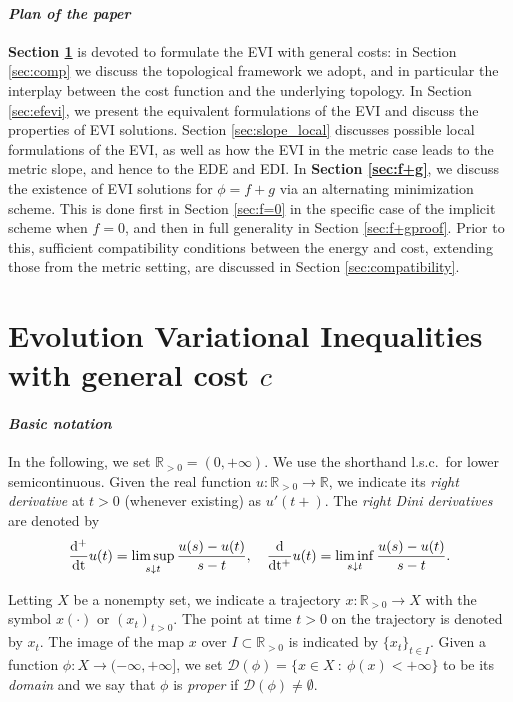 \documentclass[reqno]{amsart}
\theoremstyle{plain}
\theoremstyle{remark}
\theoremstyle{plain}
\numberwithin{equation}{section}
\theoremstyle{remark}
\newcommand{\R}{\mathbb{R}}
\newcommand{\dom}[1]{\mathscr{D}(#1)}
\begin{document}
\medskip

\paragraph{\em\bfseries Plan of the paper}   \textbf{Section \ref{sec:EVI}}    is devoted to  formulate the EVI  
with general costs: in Section \ref{sec:comp} we discuss the topological framework we adopt, and in particular the interplay between the cost function and the underlying topology.  In  Section \ref{sec:efevi}, we present the equivalent formulations of the EVI and  discuss the properties of EVI solutions.    Section \ref{sec:slope_local}  discusses  possible local formulations of the EVI,  as well as how the EVI in the metric case leads to the metric slope, and hence to the EDE and EDI. In \textbf{Section \ref{sec:f+g}}, we discuss the existence of EVI solutions for $\phi=f+g$ via an alternating minimization scheme.  This is done first  in  Section \ref{sec:f=0}  in the specific case of the implicit scheme when $f=0$, and then in full generality in Section \ref{sec:f+gproof}.  Prior to this, sufficient compatibility conditions between the energy and cost, extending those from the metric setting,  are discussed in Section \ref{sec:compatibility}. 


\section{Evolution Variational Inequalities with general cost \texorpdfstring{$c$}{c}}\label{sec:EVI}



\paragraph{\em\bfseries Basic notation}
In the following, we set $\R_{>0}=(0,+\infty)$.  We use the shorthand l.s.c.\ for lower semicontinuous. Given the real function $u:\R_{>0} \to \mathbb{R}$, we indicate its {\it right derivative} at $t>0$ (whenever existing) as $u'(t+)$. The {\it right Dini derivatives} are denoted by 
$$\frac{\rm d^+}{\rm d t}u(t)=\limsup_{s\downarrow t}\frac{u(s)-u(t)}{s-t},\quad \frac{\rm d}{\rm d t^+}u(t)=\liminf_{s\downarrow t}\frac{u(s)-u(t)}{s-t}.$$

Letting $X$ be a nonempty set, we indicate a trajectory $x:\R_{>0}\to X$ with the symbol $x(\cdot)$ or $(x_t)_{t>0}$. The point at time $t>0$ on the trajectory is denoted by $x_t$. The image of the map $x$ over $I \subset \R_{>0}$ is indicated by $\{x_t\}_{t\in I}$. Given a function $\phi:X \to (-\infty,+\infty]$, we set $\dom{\phi}=\{x\in X\::\: \phi(x)<+\infty\}$ to be its {\it domain} and we say that $\phi$ is {\it proper} if $\dom{\phi}\not = \emptyset$.
\end{document}
